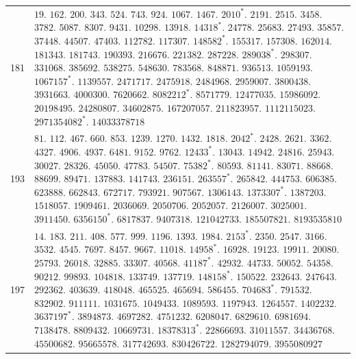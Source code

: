 \begin{longtable}{@{}r|p{\dimexpr\linewidth-38pt\relax}@{}}
181 & $19.$ $162.$ $200.$ $343.$ $524.$ $743.$ $924.$ $1067.$ $1467.$ $2010^{*}.$ $2191.$ $2515.$ $3458.$ $3782.$ $5087.$ $8307.$ $9431.$ $10298.$ $13918.$ $14318^{*}.$ $24778.$ $25683.$ $27493.$ $35857.$ $37448.$ $44507.$ $47403.$ $112782.$ $117307.$ $148582^{*}.$ $155317.$ $157308.$ $162014.$ $181343.$ $181743.$ $190393.$ $216676.$ $221382.$ $287228.$ $289038^{*}.$ $298307.$ $331068.$ $385692.$ $538275.$ $548630.$ $783568.$ $848871.$ $936513.$ $1059193.$ $1067157^{*}.$ $1139557.$ $2471717.$ $2475918.$ $2484968.$ $2959007.$ $3800438.$ $3931663.$ $4000300.$ $7620662.$ $8082212^{*}.$ $8571779.$ $12477035.$ $15986092.$ $20198495.$ $24280807.$ $34602875.$ $167207057.$ $211823957.$ $1112115023.$ $2971354082^{*}.$ $14033378718$\\
193 & $81.$ $112.$ $467.$ $660.$ $853.$ $1239.$ $1270.$ $1432.$ $1818.$ $2042^{*}.$ $2428.$ $2621.$ $3362.$ $4327.$ $4906.$ $4937.$ $6481.$ $9152.$ $9762.$ $12433^{*}.$ $13043.$ $14942.$ $24816.$ $25943.$ $30027.$ $28326.$ $45050.$ $47783.$ $54507.$ $75382^{*}.$ $80593.$ $81141.$ $83071.$ $88668.$ $88699.$ $89471.$ $137883.$ $141743.$ $236151.$ $263557^{*}.$ $265842.$ $444753.$ $606385.$ $623888.$ $662843.$ $672717.$ $793921.$ $907567.$ $1306143.$ $1373307^{*}.$ $1387203.$ $1518057.$ $1909461.$ $2036069.$ $2050706.$ $2052057.$ $2126007.$ $3025001.$ $3911450.$ $6356150^{*}.$ $6817837.$ $9407318.$ $121042733.$ $185507821.$ $8193535810$\\
197 & $14.$ $183.$ $211.$ $408.$ $577.$ $999.$ $1196.$ $1393.$ $1984.$ $2153^{*}.$ $2350.$ $2547.$ $3166.$ $3532.$ $4545.$ $7697.$ $8457.$ $9667.$ $11018.$ $14958^{*}.$ $16928.$ $19123.$ $19911.$ $20080.$ $25793.$ $26018.$ $32885.$ $33307.$ $40568.$ $41187^{*}.$ $42932.$ $44733.$ $50052.$ $54358.$ $90212.$ $99893.$ $104818.$ $133749.$ $137719.$ $148158^{*}.$ $150522.$ $232643.$ $247643.$ $292362.$ $403639.$ $418048.$ $465525.$ $465694.$ $586455.$ $704683^{*}.$ $791532.$ $832902.$ $911111.$ $1031675.$ $1049433.$ $1089593.$ $1197943.$ $1264557.$ $1402232.$ $3637197^{*}.$ $3894873.$ $4697282.$ $4751232.$ $6208047.$ $6829610.$ $6981694.$ $7138478.$ $8809432.$ $10669731.$ $18378313^{*}.$ $22866693.$ $31011557.$ $34436768.$ $45500682.$ $95665578.$ $317742693.$ $830426722.$ $1282794079.$ $3955080927$\\
\end{longtable}\endgroup

